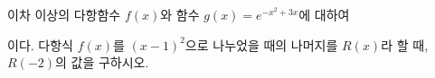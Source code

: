 이차 이상의 다항함수 $f(x)$와 함수 $g(x)=e^{-x^2+3x}$에 대하여 \par\smallskip{}\par\smallskip\noindent 이다. 다항식 $f(x)$를 $(x-1)^2$으로 나누었을 때의 나머지를 $R(x)$라 할 때, $R(-2)$의 값을 구하시오.
